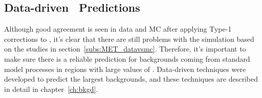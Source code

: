 \subsection{Data-driven \texorpdfstring{\MET}{MET}\ Predictions}
Although good agreement is seen in data and MC after applying Type-1 corrections to \MET, 
it's clear that there are still problems with the simulation based on the studies in section~\ref{subs:MET_datavsmc}.
Therefore, it's important to make sure there is a reliable prediction for backgrounds coming from standard model processes in regions with large values of \MET.
Data-driven techniques were developed to predict the largest backgrounds,
and these techniques are described in detail in chapter~\ref{ch:bkgd}.
